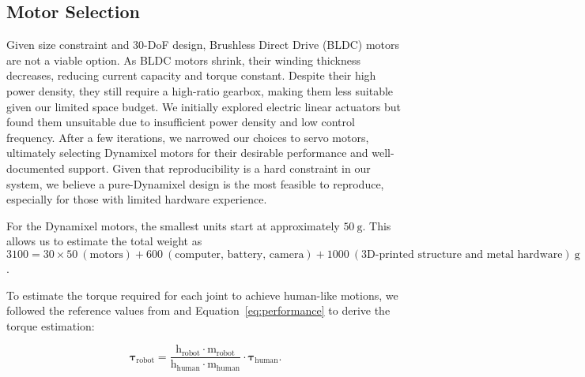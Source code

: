 \subsection{Motor Selection}
\label{sec:motor_selection}

Given \systems size constraint and 30-DoF design, Brushless Direct Drive (BLDC) motors are not a viable option. As BLDC motors shrink, their winding thickness decreases, reducing current capacity and torque constant. Despite their high power density, they still require a high-ratio gearbox, making them less suitable given our limited space budget.
We initially explored electric linear actuators but found them unsuitable due to insufficient power density and low control frequency. 
After a few iterations, we narrowed our choices to servo motors, ultimately selecting Dynamixel motors for their desirable performance and well-documented support. Given that reproducibility is a hard constraint in our system, we believe a pure-Dynamixel design is the most feasible to reproduce, especially for those with limited hardware experience.



For the Dynamixel motors, the smallest units start at approximately $50~\mathrm{g}$. This allows us to estimate the total weight as $3100= 30\times50~(\text{motors}) + 600~(\text{computer, battery, camera}) + 1000~(\text{3D-printed structure and metal hardware})~\mathrm{g}$.

To estimate the torque required for each joint to achieve human-like motions, we followed the reference values from \cite{grimmer2020human} and Equation~\ref{eq:performance} to derive the torque estimation:

\begin{equation}
    \bm{\tau}_{\text{robot}} = \frac{\mathrm{h}_{\text{robot}} \cdot \mathrm{m}_{\text{robot}}}{\mathrm{h}_{\text{human}} \cdot \mathrm{m}_{\text{human}}} \cdot \bm{\tau}_{\text{human}}.
\end{equation}

